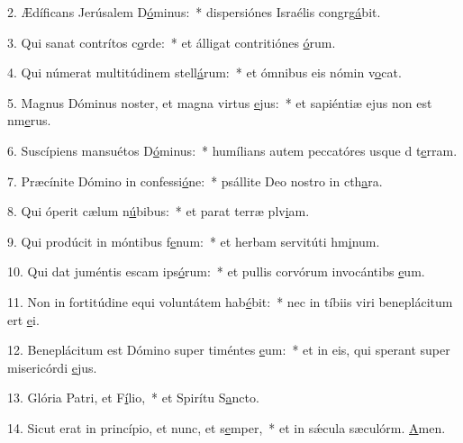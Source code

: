 2. Ædíficans Jerúsalem D\uline{ó}minus:~* dispersiónes Israélis congrg\uline{á}bit.\par 
3. Qui sanat contrítos c\uline{o}rde:~* et álligat contritiónes \uline{ó}rum.\par 
4. Qui númerat multitúdinem stell\uline{á}rum:~* et ómnibus eis nómin v\uline{o}cat.\par 
5. Magnus Dóminus noster, et magna virtus \uline{e}jus:~* et sapiéntiæ ejus non est nm\uline{e}rus.\par 
6. Suscípiens mansuétos D\uline{ó}minus:~* humílians autem peccatóres usque d t\uline{e}rram.\par 
7. Præcínite Dómino in confessi\uline{ó}ne:~* psállite Deo nostro in cth\uline{a}ra.\par 
8. Qui óperit cælum n\uline{ú}bibus:~* et parat terræ plv\uline{i}am.\par 
9. Qui prodúcit in móntibus f\uline{e}num:~* et herbam servitúti hm\uline{i}num.\par 
10. Qui dat juméntis escam ips\uline{ó}rum:~* et pullis corvórum invocántibs \uline{e}um.\par 
11. Non in fortitúdine equi voluntátem hab\uline{é}bit:~* nec in tíbiis viri beneplácitum ert \uline{e}i.\par 
12. Beneplácitum est Dómino super timéntes \uline{e}um:~* et in eis, qui sperant super misericórdi \uline{e}jus.\par 
13. Glória Patri, et F\uline{í}lio,~* et Spirítu S\uline{a}ncto.\par 
14. Sicut erat in princípio, et nunc, et s\uline{e}mper,~* et in sǽcula sæculórm. \uline{A}men.\par 
